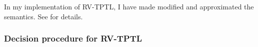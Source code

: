\documentclass[a4paper]{article}
\newcommand{\tand}{\text{ and }}
\newcommand{\tor}{\text{ or }}
\newcommand{\tiff}{\text{ iff }}
\newcommand{\sn}{\bigcirc^+}
\newcommand{\wn}{\bigcirc^-}
\begin{document}
In my implementation of RV-TPTL, I have made modified and approximated the semantics. See  for details.

\subsubsection{Decision procedure for RV-TPTL} %



\end{document}
